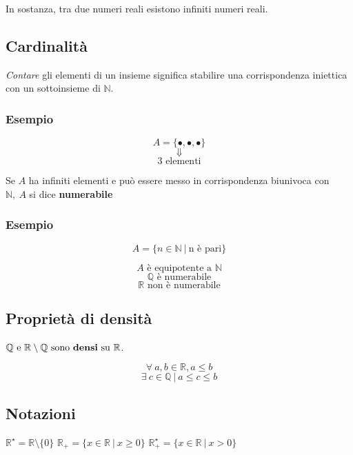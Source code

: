 \begin{itemize}
            In sostanza, tra due numeri reali esistono infiniti numeri reali.
    \end{itemize}
\subsection{Cardinalità}
\textit{Contare} gli elementi di un insieme significa stabilire una corrispondenza iniettica con un sottoinsieme di $\mathbb{N}$.

\subsubsection*{Esempio}
\begin{Large}
    \[
        A = \{\bullet,\bullet,\bullet\}
    \]
    \[
        \Downarrow
    \]
    \[
        \text{3 elementi}    
    \]
\end{Large}
Se $A$ ha infiniti elementi e può essere messo in corrispondenza biunivoca con $\mathbb{N},\ A$ si dice \textbf{numerabile}
\subsubsection*{Esempio}
    \begin{Large}
    \[A = \{n \in \mathbb{N}\ |\ \text{n è pari} \}\] \newline
    \end{Large}
    \[A \text{ è equipotente a }\mathbb{N}\]
    \[\mathbb{Q} \text{ è numerabile}\]
    \[\mathbb{R} \text{ non è numerabile}\]
\subsection{Proprietà di densità}
    $\mathbb{Q} \text{ e } \mathbb{R} \setminus \mathbb{Q} \text{ sono \textbf{densi} su }\mathbb{R}$.
    \begin{Large}
        \begin{equation*}
            \forall\ a,b \in \mathbb{R},a \le b
        \end{equation*}
        \begin{equation*}
            \exists\ c \in \mathbb{Q}\ |\ a \le c \le b 
        \end{equation*}
    \end{Large}
\subsection{Notazioni}
\begin{Large}
    $\mathbb{R}^{\star} = \mathbb{R} \setminus \{0\}$\newline
    $\mathbb{R}_{+} = \{x \in \mathbb{R}\ |\ x \geq 0\}$\newline
    $\mathbb{R}_{+}^{\star} = \{x \in \mathbb{R}\ |\ x > 0\}$
\end{Large}
